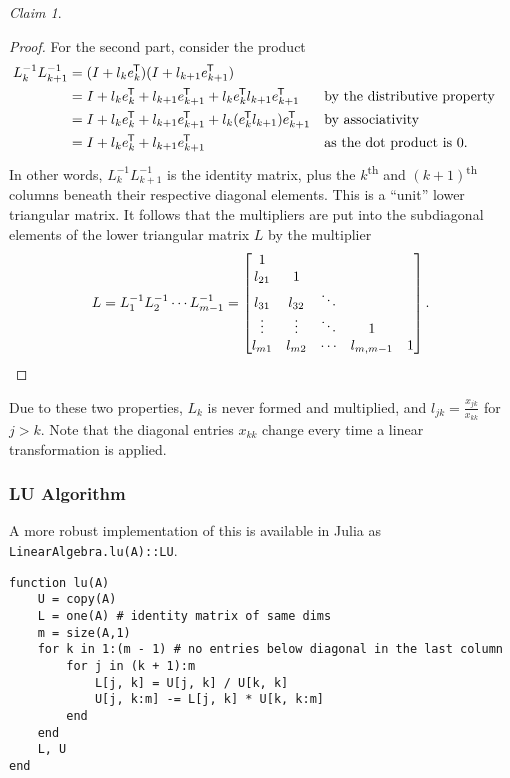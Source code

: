 \documentclass[12pt,letterpaper,DIV=11]{scrartcl}
\theoremstyle{plain}
\theoremstyle{definition}
\theoremstyle{remark}
\newtheorem{claim}{Claim}
\begin{document}
\begin{claim}
\begin{proof}
    For the second part, consider the product \begin{align*}
      L_k^{-1} L_{k + 1}^{-1} &= (I + l_k e_k^{\mkern-1.5mu\mathsf{T}}) (I + l_{k + 1} e_{k + 1}^{\mkern-1.5mu\mathsf{T}}) \\
                              &= I + l_k e_k^{\mkern-1.5mu\mathsf{T}} + l_{k + 1} e_{k + 1}^{\mkern-1.5mu\mathsf{T}} + l_k e_k^{\mkern-1.5mu\mathsf{T}} l_{k + 1} e_{k + 1}^{\mkern-1.5mu\mathsf{T}} && \text{by the distributive property} \\
                              &= I + l_k e_k^{\mkern-1.5mu\mathsf{T}} + l_{k + 1} e_{k + 1}^{\mkern-1.5mu\mathsf{T}} + l_k (e_k^{\mkern-1.5mu\mathsf{T}} l_{k + 1}) e_{k + 1}^{\mkern-1.5mu\mathsf{T}} && \text{by associativity} \\
                              &= I + l_k e_k^{\mkern-1.5mu\mathsf{T}} + l_{k + 1} e_{k + 1}^{\mkern-1.5mu\mathsf{T}} && \text{as the dot product is 0}.
    \end{align*}
    In other words, $L_k^{-1} L_{k + 1}^{-1}$ is the identity matrix, plus the $k$\textsuperscript{th} and $(k + 1)$\textsuperscript{th} columns beneath their respective diagonal elements.
    This is a \enquote{unit} lower triangular matrix.
    It follows that the multipliers are put into the subdiagonal elements of the lower triangular matrix $L$ by the multiplier
    \begin{displaymath}
      L = L_1^{-1} L_2^{-1} \cdots L_{m - 1}^{-1} = \begin{bmatrix}
        1       &        &        &             &   \\
        l_{21}  & 1      &        &             &   \\
        l_{31}  & l_{32} & \ddots &             &   \\
        \vdots  & \vdots & \ddots & 1           &   \\
        l_{m1}  & l_{m2} & \cdots & l_{m,m - 1} & 1
      \end{bmatrix}.
      \qedhere
    \end{displaymath}
  \end{proof}

  Due to these two properties, $L_k$ is never formed and multiplied, and $l_{jk} = \frac{x_{jk}}{x_{kk}}$ for $j > k$.
  Note that the diagonal entries $x_{kk}$ change every time a linear transformation is applied.
\end{claim}

\subsubsection{LU Algorithm}
A more robust implementation of this is available in Julia as \texttt{LinearAlgebra.lu(A)::LU}.
\begin{verbatim}
function lu(A)
    U = copy(A)
    L = one(A) # identity matrix of same dims
    m = size(A,1)
    for k in 1:(m - 1) # no entries below diagonal in the last column
        for j in (k + 1):m
            L[j, k] = U[j, k] / U[k, k]
            U[j, k:m] -= L[j, k] * U[k, k:m]
        end
    end
    L, U
end
\end{verbatim}
\end{document}
